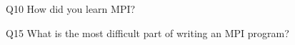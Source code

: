 \begin{description}%
\item{Q10} How did you learn MPI?%
\item{Q15} What is the most difficult part of writing an MPI program?%
\end{description}%
